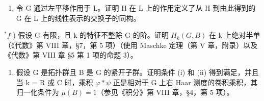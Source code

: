 \begin{enumerate}
\def\labelenumi{\alph{enumi})}
\setcounter{enumi}{4}
\tightlist
\item
  令 G 通过左平移作用于 L。证明 H 在 L 上的作用定义了从 H 到由此得到的 G 在 L 上的线性表示的交换子的同构。
\end{enumerate}

\(^{*}f\) ) 假设 G 有限，且 k 的特征不整除 G 的阶。证明 \(H_{k}(G,B)\) 在 k 上绝对半单（《代数》第 VIII 章，§7，第 5 项）（使用 Maschke 定理（第 V 章，附录）以及《代数》第 VIII 章 §5 第 1 项的命题 3）。

\begin{enumerate}
\def\labelenumi{\alph{enumi})}
\setcounter{enumi}{6}
\tightlist
\item
  假设 G 是拓扑群且 B 是 G 的紧开子群。证明条件 (i) 和 (ii) 得到满足，并且当 k = R 或 C 时，乘积 \(\varphi * \psi\) 正是相对于 G 上右 Haar 测度的卷积乘积，其归一化条件为 \(\mu(B) = 1\)（参见《积分》第 VIII 章，§4，第 5 项）。
\end{enumerate}
